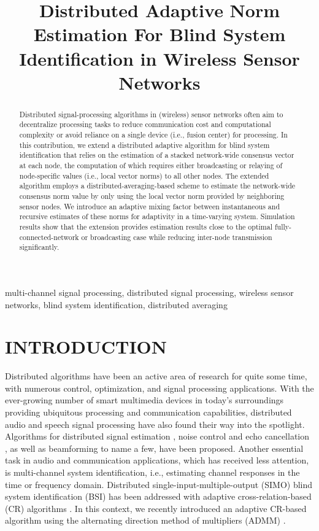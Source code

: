 \documentclass{article}
\title{Distributed Adaptive Norm Estimation For Blind System\\Identification in Wireless Sensor Networks}
\begin{document}
\ninept
%
\maketitle
%
\begin{abstract}
    Distributed signal-processing algorithms in (wireless) sensor networks often aim to decentralize processing tasks to reduce communication cost and computational complexity or avoid reliance on a single device (i.e., fusion center) for processing.
    In this contribution, we extend a distributed adaptive algorithm for blind system identification that relies on the estimation of a stacked network-wide consensus vector at each node, the computation of which requires either broadcasting or relaying of node-specific values (i.e., local vector norms) to all other nodes.
    The extended algorithm employs a distributed-averaging-based scheme to estimate the network-wide consensus norm value by only using the local vector norm provided by neighboring sensor nodes.
    We introduce an adaptive mixing factor between instantaneous and recursive estimates of these norms for adaptivity in a time-varying system.
    Simulation results show that the extension provides estimation results close to the optimal fully-connected-network or broadcasting case while reducing inter-node transmission significantly.
\end{abstract}
%
\begin{keywords}
multi-channel signal processing, distributed signal processing, wireless sensor networks, blind system identification, distributed averaging
\end{keywords}
%
\section{INTRODUCTION}
\label{sec:intro}

Distributed algorithms have been an active area of research for quite some time, with numerous control, optimization, and signal processing applications.
With the ever-growing number of smart multimedia devices in today's surroundings providing ubiquitous processing and communication capabilities, distributed audio and speech signal processing have also found their way into the spotlight.
Algorithms for distributed signal estimation \cite{5483092}, noise control and echo cancellation \cite{9670697}, as well as beamforming \cite{6663655,6329934,MARKOVICHGOLAN20154,6309434} to name a few, have been proposed.
Another essential task in audio and communication applications, which has received less attention, is multi-channel system identification, i.e., estimating channel responses in the time or frequency domain.
Distributed single-input-multiple-output (SIMO) blind system identification (BSI) has been addressed with adaptive cross-relation-based (CR) algorithms \cite{yuDistributedBlindSystem2014, liuDistributedBlindIdentification2016}.
In this context, we recently introduced an adaptive CR-based algorithm \cite{blochbergerDBSI} using the alternating direction method of multipliers (ADMM) \cite{boydDistributedOptimizationStatistical2011}.
\end{document}

